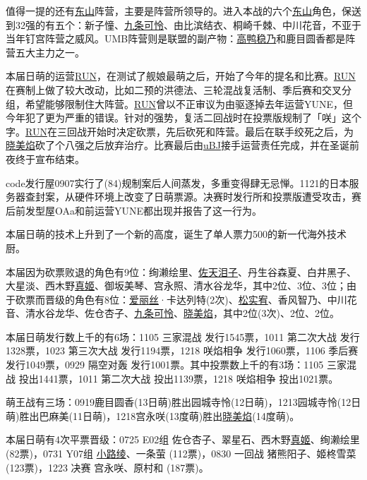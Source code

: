 值得一提的还有\uline{东山}阵营，主要是阵营所领导的。进入本战的六个\uline{东山}角色，保送到32强的有五个：新子憧、\uline{九条可怜}、由比滨结衣、桐崎千棘、中川花音，不亚于当年钉宫阵营之威风。UMB阵营则是联盟的副产物：\uline{高鸭稳乃}和鹿目圆香都是阵营五大主力之一。

本届日萌的运营\uline{RUN}，在测试了舰娘最萌之后，开始了今年的提名和比赛。\uline{RUN}在赛制上做了较大改动，比如二预的洪德法、三轮混战复活制、季后赛和交叉分组，希望能够限制住大阵营。\uline{RUN}曾以不正审议为由驱逐掉去年运营YUNE，但今年犯了更为严重的错误。针对的强势，复活二回战时在投票版规制了「咲」这个字。\uline{RUN}在三回战开始时决定砍票，先后砍死和阵营。最后在联手绞死之后，为\uline{晓美焰}砍了个八强之后放弃治疗。比赛最后由\uline{uBJ}接手运营责任完成，并在圣诞前夜终于宣布结束。

code发行屋0907实行了(84)规制案后人间蒸发，多重变得肆无忌惮。1121的日本服务器查封案，从硬件环境上改变了日萌票源。决赛时发行所和投票版遭受攻击，赛后前发型屋OAa和前运营YUNE都出现并报告了这一行为。

本届日萌的技术上升到了一个新的高度，诞生了单人票力500的新一代海外技术厨。

本届因为砍票败退的角色有9位：绚濑绘里、\uline{佐天泪子}、丹生谷森夏、白井黑子、大星淡、西木野\uline{真姬}、御坂美琴、宫永照、清水谷龙华，其中2位、3位、3位；由于砍票而晋级的角色有8位：\uline{爱丽丝}·卡达列特(2次)、\uline{松实宥}、香风智乃、中川花音、清水谷龙华、佐仓杏子、\uline{九条可怜}、\uline{晓美焰}，其中2位(3次)、2位、2位。

本届日萌发行数上千的有6场：1105 三家混战 发行1545票，1011 第二次大战 发行1328票，1023 第三次大战 发行1194票，1218 咲焰相争 发行1060票，1106 季后赛 发行1049票，0929 隔空对轰 发行1001票。其中投票数上千的有3场：1105 三家混战 投出1441票，1011 第二次大战 投出1139票，1218 咲焰相争 投出1021票。

萌王战有三场：0919鹿目圆香(13日萌)胜出园城寺怜(12日萌)，1213园城寺怜(12日萌)胜出巴麻美(11日萌)，1218宫永咲(13度萌)胜出\uline{晓美焰}(14度萌)。

本届日萌有4次平票晋级：0725 E02组 佐仓杏子、翠星石、西木野\uline{真姬}、绚濑绘里 (82票)，0731 Y07组 \uline{小路绫}、一条萤 (112票)，0830 一回战 猪熊阳子、姬柊雪菜 (123票)，1223 决赛 宫永咲、原村和 (187票)。


